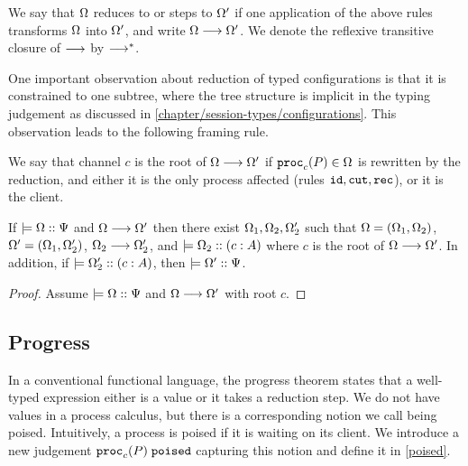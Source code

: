 We say that $\Omega$ reduces to or steps to $\Omega'$ if one application of the above rules transforms $\Omega$ into $\Omega'$, and write $\Omega \longrightarrow \Omega'$. We denote the reflexive transitive closure of $\longrightarrow$ by $\longrightarrow^*$.

One important observation about reduction of typed configurations is that it is constrained to one subtree, where the tree structure is implicit in the typing judgement as discussed in \cref{chapter/session-types/configurations}. This observation leads to the following framing rule.

\begin{definition} We say that channel $c$ is the root of $\Omega \longrightarrow \Omega'$ if $\mathtt{proc}_{c}(P) \in \Omega$ is rewritten by the reduction, and either it is the only process affected (rules $\texttt{id}, \texttt{cut}, \texttt{rec}$), or it is the client.
\end{definition}

\begin{lemma}[Framing]
  \label{framing}
  If $\models {\Omega} :: {\Psi}$ and $\Omega \longrightarrow \Omega'$ then there exist $\Omega_1, \Omega_2, \Omega_2'$ such that $\Omega = (\Omega_1, \Omega_2)$, $\Omega' = (\Omega_1, \Omega_2')$, $\Omega_2 \longrightarrow \Omega_2'$, and $\models {\Omega_2} :: ({c} : {A})$ where $c$ is the root of $\Omega \longrightarrow \Omega'$. In addition, if $\models {\Omega_2'} :: ({c} : {A})$, then $\models {\Omega'} :: {\Psi}$.
\end{lemma}

\begin{proof}
  Assume $\models {\Omega} :: {\Psi}$ and $\Omega \longrightarrow \Omega'$ with root $c$. 
\end{proof}


\subsection{Progress}

In a conventional functional language, the progress theorem states that a well-typed expression either is a value or it takes a reduction step. We do not have values in a process calculus, but there is a corresponding notion we call being poised. Intuitively, a process is poised if it is waiting on its client. We introduce a new judgement $\mathtt{proc}_{c}(P)\;\mathtt{poised}$ capturing this notion and define it in \cref{poised}. 


